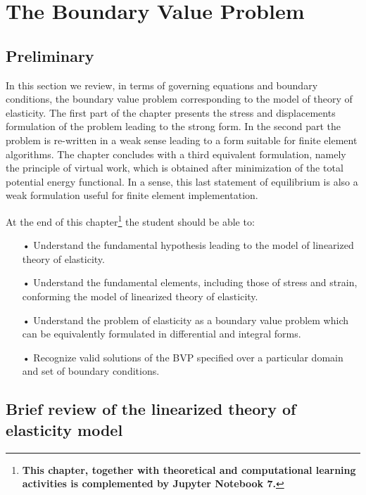 \graphicspath{ {./img/TheFEM/} }
\chapter{The Boundary Value Problem}

\section*{Preliminary}
In this section we review, in terms of governing equations and boundary conditions, the boundary value problem corresponding to the model of theory of elasticity. The first part of the chapter presents the stress and displacements formulation of the problem leading to the strong form. In the second part the problem is re-written in a weak sense leading to a form suitable for finite element algorithms. The chapter concludes with a third equivalent formulation, namely the principle of virtual work, which is obtained after minimization of the total potential energy functional. In a sense, this last statement of equilibrium is also a weak formulation useful for finite element implementation.

At the end of this chapter\footnote{{\bf This chapter, together with theoretical and computational learning activities is complemented by Jupyter Notebook 7.}} the student should be able to:


\begin{itemize}
\item[•] Understand the fundamental hypothesis leading to the model of linearized theory of elasticity.

\item[•] Understand the fundamental elements, including those of stress and strain, conforming the model of linearized theory of elasticity.

\item[•] Understand the problem of elasticity as a boundary value problem which can be equivalently formulated in differential and integral forms.

\item[•] Recognize valid solutions of the BVP specified over a particular domain and set of boundary conditions.

\end{itemize}

\section{Brief review of the linearized theory of elasticity model}
